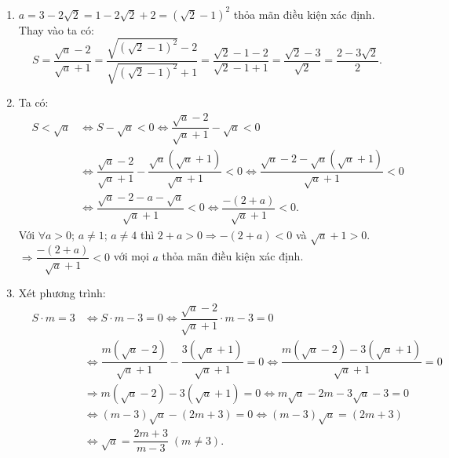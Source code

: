 \begin{bt}
{\begin{enumerate}
			$$ \Rightarrow \dfrac{\sqrt a  - 2}{\sqrt a  + 1} < 1 \Leftrightarrow S < 1$$
			Suy ra điều phải chứng minh.
			\item $a = 3 - 2\sqrt 2  = 1 - 2\sqrt 2  + 2 = {\left( \sqrt 2  - 1 \right)^2}$ thỏa mãn điều kiện xác định.\\
			Thay vào ta có:
			$$S = \dfrac{\sqrt a  - 2}{\sqrt a  + 1} = \dfrac{\sqrt {\left( \sqrt 2  - 1 \right)^2}  - 2}{\sqrt {\left( \sqrt 2  - 1 \right)^2}  + 1} = \dfrac{\sqrt 2  - 1 - 2}{\sqrt 2  - 1 + 1} = \dfrac{\sqrt 2  - 3}{\sqrt 2 } = \dfrac{2 - 3\sqrt 2 }{2} .$$
			\item Ta có: \begin{eqnarray*}
				& S < \sqrt a & \Leftrightarrow S - \sqrt a  < 0 \Leftrightarrow \dfrac{\sqrt a  - 2}{\sqrt a  + 1} - \sqrt a  < 0\\
				& & \Leftrightarrow \dfrac{\sqrt a  - 2}{\sqrt a  + 1} - \dfrac{\sqrt a \left( \sqrt a  + 1 \right)}{\sqrt a  + 1} < 0 \Leftrightarrow \dfrac{\sqrt a  - 2 - \sqrt a \left( \sqrt a  + 1 \right)}{\sqrt a  + 1} < 0 \\
				& & \Leftrightarrow \dfrac{\sqrt a  - 2 - a - \sqrt a }{\sqrt a  + 1} < 0 \Leftrightarrow \dfrac{ - \left( 2 + a \right)}{\sqrt a  + 1} < 0.
			\end{eqnarray*}
			Với $\forall a > 0$; $a \ne 1$; $a \ne 4$ thì $2 + a > 0 \Rightarrow  - \left( 2 + a \right) < 0$ và $\sqrt a  + 1 > 0$.\\
			$ \Rightarrow \dfrac{ - \left( 2 + a \right)}{\sqrt a  + 1} < 0$ với mọi $a$ thỏa mãn điều kiện xác định.
			\item 	Xét phương trình:
			\begin{eqnarray*}
				& S \cdot m = 3 & \Leftrightarrow S \cdot m - 3 = 0 \Leftrightarrow \dfrac{\sqrt a  - 2}{\sqrt a  + 1} \cdot m - 3 = 0 \\
				& & \Leftrightarrow \dfrac{m\left( \sqrt a  - 2 \right)}{\sqrt a  + 1} - \dfrac{3\left( \sqrt a  + 1 \right)}{\sqrt a  + 1} = 0 \Leftrightarrow \dfrac{m\left( \sqrt a  - 2 \right) - 3\left( \sqrt a  + 1 \right)}{\sqrt a  + 1} = 0 \\
				& & \Rightarrow m\left( \sqrt a  - 2 \right) - 3\left( \sqrt a  + 1 \right) = 0 \Leftrightarrow m\sqrt a  - 2m - 3\sqrt a  - 3 = 0 \\
				& & \Leftrightarrow \left( m - 3 \right)\sqrt a  - \left( 2m + 3 \right) = 0 \Leftrightarrow \left( m - 3 \right)\sqrt a  = \left( 2m + 3 \right) \\
				& & \Leftrightarrow \sqrt a  = \dfrac{2m + 3}{m - 3}\;\left( m \ne 3 \right) .

\end{eqnarray*}
\end{enumerate}}
\end{bt}
